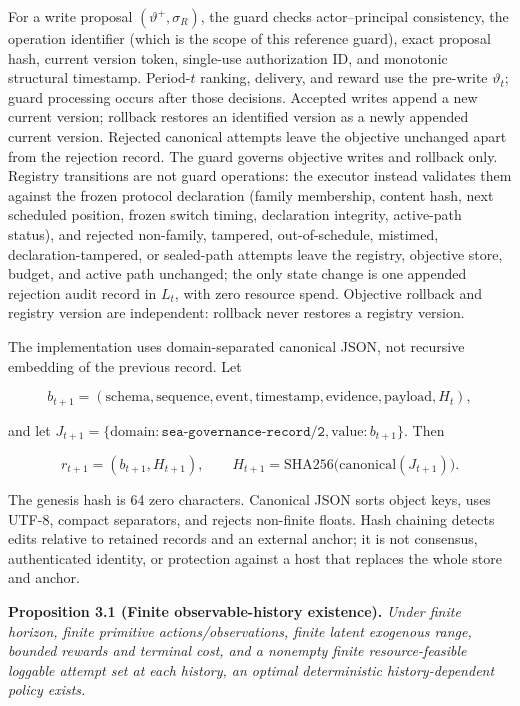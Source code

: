 \documentclass[
  11pt]{article}
\begin{document}
For a write proposal \((\vartheta^+,\sigma_R)\), the guard checks
actor--principal consistency, the operation identifier (which is the
scope of this reference guard), exact proposal hash, current version
token, single-use authorization ID, and monotonic structural timestamp.
Period-\(t\) ranking, delivery, and reward use the pre-write
\(\vartheta_t\); guard processing occurs after those decisions. Accepted
writes append a new current version; rollback restores an identified
version as a newly appended current version. Rejected canonical attempts
leave the objective unchanged apart from the rejection record. The guard
governs objective writes and rollback only. Registry transitions are not
guard operations: the executor instead validates them against the frozen
protocol declaration (family membership, content hash, next scheduled
position, frozen switch timing, declaration integrity, active-path
status), and rejected non-family, tampered, out-of-schedule, mistimed,
declaration-tampered, or sealed-path attempts leave the registry,
objective store, budget, and active path unchanged; the only state
change is one appended rejection audit record in \(L_t\), with zero
resource spend. Objective rollback and registry version are independent:
rollback never restores a registry version.

The implementation uses domain-separated canonical JSON, not recursive
embedding of the previous record. Let

\[b_{t+1}=(\mathrm{schema},\mathrm{sequence},\mathrm{event},\mathrm{timestamp},\mathrm{evidence},\mathrm{payload},H_t),\]

and let
\(J_{t+1}=\{\mathrm{domain}:\texttt{sea-governance-record/2},\mathrm{value}:b_{t+1}\}\).
Then

\[r_{t+1}=(b_{t+1},H_{t+1}),\qquad H_{t+1}=\mathrm{SHA256}\bigl(\mathrm{canonical}(J_{t+1})\bigr).\tag{3}\]

The genesis hash is 64 zero characters. Canonical JSON sorts object
keys, uses UTF-8, compact separators, and rejects non-finite floats.
Hash chaining detects edits relative to retained records and an external
anchor; it is not consensus, authenticated identity, or protection
against a host that replaces the whole store and anchor.

\textbf{Proposition 3.1 (Finite observable-history existence).}
\emph{Under finite horizon, finite primitive actions/observations,
finite latent exogenous range, bounded rewards and terminal cost, and a
nonempty finite resource-feasible loggable attempt set at each history,
an optimal deterministic history-dependent policy exists.}
\end{document}
